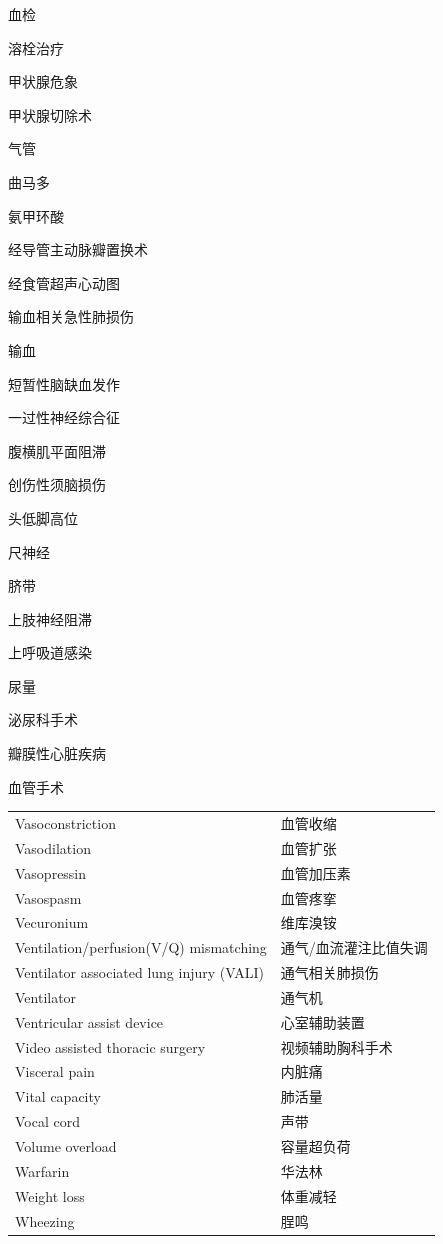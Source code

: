\documentclass[10pt]{article}
\begin{document}
血检

溶栓治疗

甲状腺危象

甲状腺切除术

气管

曲马多

氨甲环酸

经导管主动脉瓣置换术

经食管超声心动图

输血相关急性肺损伤

输血

短暂性脑缺血发作

一过性神经综合征

腹横肌平面阻滞

创伤性须脑损伤

头低脚高位

尺神经

脐带

上肢神经阻滞

上呼吸道感染

尿量

泌尿科手术

瓣膜性心脏疾病

血管手术

\begin{center}
\begin{tabular}{ll}
Vasoconstriction & 血管收缩 \\
Vasodilation & 血管扩张 \\
Vasopressin & 血管加压素 \\
Vasospasm & 血管疼挛 \\
Vecuronium & 维库溴铵 \\
Ventilation/perfusion(V/Q) mismatching & 通气/血流灌注比值失调 \\
Ventilator associated lung injury (VALI) & 通气相关肺损伤 \\
Ventilator & 通气机 \\
Ventricular assist device & 心室辅助装置 \\
Video assisted thoracic surgery & 视频辅助胸科手术 \\
Visceral pain & 内脏痛 \\
Vital capacity & 肺活量 \\
Vocal cord & 声带 \\
Volume overload & 容量超负荷 \\
Warfarin & 华法林 \\
Weight loss & 体重减轻 \\
Wheezing & 脭鸣 \\
\end{tabular}
\end{center}
\end{document}
